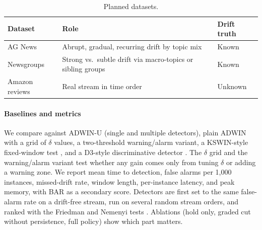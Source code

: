 \documentclass[conference]{IEEEtran}
\begin{document}
\begin{table}[!t]
\centering
\caption{Planned datasets.}
\label{tab:data}
\small
\begin{tabular}{>{\raggedright\arraybackslash}p{1.85cm}>{\raggedright\arraybackslash}p{3.6cm}>{\raggedright\arraybackslash}p{1.4cm}}
\toprule
Dataset & Role & Drift truth \\
\midrule
AG News & Abrupt, gradual, recurring drift by topic mix & Known \\
20 Newsgroups & Strong vs.\ subtle drift via macro-topics or sibling groups & Known \\
Amazon reviews & Real stream in time order & Unknown \\
\bottomrule
\end{tabular}
\end{table}

\paragraph{Baselines and metrics}
We compare against ADWIN-U (single and multiple detectors), plain ADWIN with a grid of $\delta$ values, a two-threshold warning/alarm variant, a KSWIN-style fixed-window test \cite{raab2020}, and a D3-style discriminative detector \cite{gozuacik2019}. The $\delta$ grid and the warning/alarm variant test whether any gain comes only from tuning $\delta$ or adding a warning zone. We report mean time to detection, false alarms per 1,000 instances, missed-drift rate, window length, per-instance latency, and peak memory, with BAR \cite{assis2025} as a secondary score. Detectors are first set to the same false-alarm rate on a drift-free stream, run on several random stream orders, and ranked with the Friedman and Nemenyi tests \cite{demsar2006}. Ablations (hold only, graded cut without persistence, full policy) show which part matters.
\end{document}
